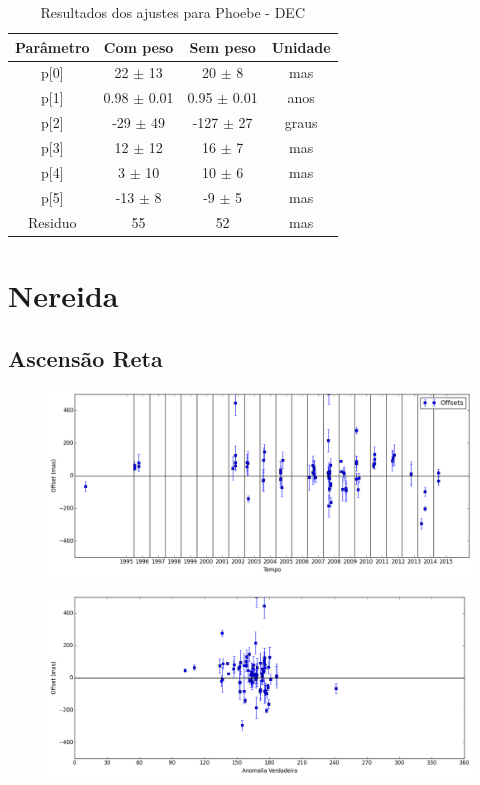\documentclass[11pt,a4paper]{report}
\begin{document}
\begin{table}[h!]
\caption{\label{Tab: Phoebe-DEC} Resultados dos ajustes para Phoebe - DEC}
\begin{centering}
\begin{tabular}{cccc}
\hline
\hline
Parâmetro & Com peso & Sem peso & Unidade\tabularnewline
\hline
p[0] & 22 $\pm$ 13 & 20 $\pm$ 8 & mas\\
p[1] & 0.98 $\pm$ 0.01 & 0.95 $\pm$ 0.01 & anos\\
p[2] & -29 $\pm$ 49 & -127 $\pm$ 27 & graus\\
p[3] & 12 $\pm$ 12 & 16 $\pm$ 7 & mas\\
p[4] & 3 $\pm$ 10 & 10 $\pm$ 6 & mas\\
p[5] & -13 $\pm$ 8 & -9 $\pm$ 5 & mas\\
Residuo & 55 & 52 & mas\\
\hline 
\end{tabular} 
\par\end{centering}
\end{table}

\chapter*{Nereida}
\section*{Ascensão Reta}

\begin{figure}[h]
\includegraphics[scale=0.45]{Nereida/RA.png} 
\end{figure}

\begin{figure}[h]
\includegraphics[scale=0.45]{Nereida/RA_anom.png}  
\end{figure}
\end{document}
